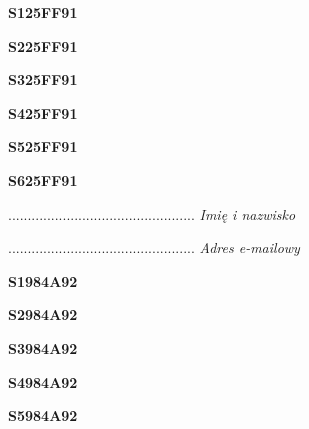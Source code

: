 \begin{turn}{90}\huge \textbf{S125FF91}\end{turn}

\begin{turn}{90}\huge \textbf{S225FF91}\end{turn}

\begin{turn}{90}\huge \textbf{S325FF91}\end{turn}

\begin{turn}{90}\huge \textbf{S425FF91}\end{turn}

\begin{turn}{90}\huge \textbf{S525FF91}\end{turn}

\begin{turn}{90}\huge \textbf{S625FF91}\end{turn}

\begin{turn}{90}\begin{minipage}{\linewidth} \vspace{20mm} ................................................  \textit{Imię i nazwisko}\end{minipage}\end{turn}

\begin{turn}{90}\begin{minipage}{\linewidth} \vspace{20mm} ................................................  \textit{Adres e-mailowy}\end{minipage}\end{turn}

\begin{turn}{90}\huge \textbf{S1984A92}\end{turn}

\begin{turn}{90}\huge \textbf{S2984A92}\end{turn}

\begin{turn}{90}\huge \textbf{S3984A92}\end{turn}

\begin{turn}{90}\huge \textbf{S4984A92}\end{turn}

\begin{turn}{90}\huge \textbf{S5984A92}\end{turn}

